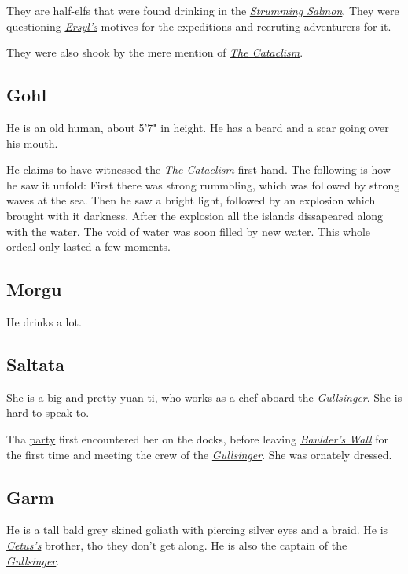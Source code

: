 \documentclass{article}
\begin{document}
\begin{multicols}{2}
    They are half-elfs that were found drinking in the \hyperref[strumming_salmon]{\textit{Strumming Salmon}}. They were questioning \hyperref[ersyl]{\textit{Ersyl's}} motives for the expeditions and recruting
    adventurers for it.

    They were also shook by the mere mention of \hyperref[cataclism]{\textit{The Cataclism}}.

    \subsection{Gohl}
    \label{gohl}

    He is an old human, about 5'7" in height. He has a beard and a scar going over his mouth.

    He claims to have witnessed the \hyperref[cataclism]{\textit{The Cataclism}} first hand. The following is how he saw it unfold:
    First there was strong rummbling, which was followed by strong waves at the sea. Then he saw a bright light, followed by an explosion which brought with it darkness. After the explosion all the islands
    dissapeared along with the water. The void of water was soon filled by new water.
    This whole ordeal only lasted a few moments.

    \subsection{Morgu}
    \label{morgu}

    He drinks a lot.

    \subsection{Saltata}
    \label{Saltata}

    She is a big and pretty yuan-ti, who works as a chef aboard the \hyperref[gullsinger]{\textit{Gullsinger}}. She is hard to speak to.

    Tha \hyperref[party]{party} first encountered her  on the docks, before leaving \hyperref[baulders_wall]{\textit{Baulder's Wall}} for the first time and meeting the crew of the
    \hyperref[gullsinger]{\textit{Gullsinger}}. She was ornately dressed.

    \subsection{Garm}
    \label{garm}

    He is a tall bald grey skined goliath with piercing silver eyes and a braid. He is \hyperref[cetus]{\textit{Cetus's}} brother, tho they don't get along. He is also the captain of the
    \hyperref[gullsinger]{\textit{Gullsinger}}.


\end{multicols}
\end{document}
